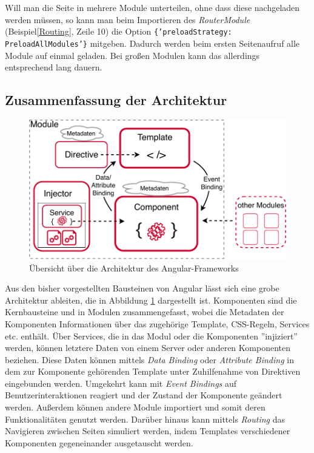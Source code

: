 Will man die Seite in mehrere Module unterteilen, ohne dass diese nachgeladen werden müssen, so kann man beim Importieren des \textit{RouterModule} (Beispiel\ref{Routing}, Zeile 10) die Option \texttt{\{'preloadStrategy: PreloadAllModules'\}} mitgeben. Dadurch werden beim ersten Seitenaufruf alle Module auf einmal geladen. Bei großen Modulen kann das allerdings entsprechend lang dauern.

\subsection{Zusammenfassung der Architektur}
\label{sec:technologies:angular:architecture}

\begin{figure}[h]
\centering
	\includegraphics{gfx/Architektur}
	\caption[Übersicht über die Architektur des Angular-Frameworks]{Übersicht über die Architektur des Angular-Frameworks\cite{Architecture}}
	\label{fig:technologies:angular:architecture}
\end{figure}

Aus den bisher vorgestellten Bausteinen von Angular lässt sich eine grobe Architektur ableiten, die in Abbildung \ref{fig:technologies:angular:architecture} dargestellt ist. Komponenten sind die Kernbausteine und in Modulen zusammengefasst, wobei die Metadaten der Komponenten Informationen über das zugehörige Template, CSS-Regeln, Services etc. enthält. Über Services, die in das Modul oder die Komponenten ''injiziert'' werden, können letztere Daten von einem Server oder anderen Komponenten beziehen. Diese Daten können mittels \textit{Data Binding} oder \textit{Attribute Binding} in dem zur Komponente gehörenden Template unter Zuhilfenahme von Direktiven eingebunden werden. Umgekehrt kann mit \textit{Event Bindings} auf Benutzerinteraktionen reagiert und der Zustand der Komponente geändert werden. Außerdem können andere Module importiert und somit deren Funktionalitäten genutzt werden. Darüber hinaus kann mittels \textit{Routing} das Navigieren zwischen Seiten simuliert werden, indem Templates verschiedener Komponenten gegeneinander ausgetauscht werden.

